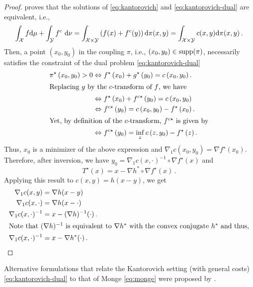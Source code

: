 \begin{proof}
\citet[Theorem 1.39]{santambrogio2015optimal} proves that the solutions of \eqref{eq:kantorovich} and \eqref{eq:kantorovich-dual} are equivalent, i.e.,
\begin{equation*}
	\int_{\mathcal{X}} f \mathrm{d} \mu+\int_{\mathcal{Y}} f^c \mathrm{~d} \nu=\int_{{\mathcal{X}} \times {\mathcal{Y}}}\left(f(x)+f^c(y)\right) \mathrm{d} \pi(x, y)=\int_{{\mathcal{X}} \times {\mathcal{Y}}} c(x, y) \mathrm{d} \pi(x, y)\,.
\end{equation*}
Then, a point $(x_0, y_0)$ in the coupling $\pi$, i.e., $(x_0, y_0) \in \operatorname{supp}(\pi)$, necessarily satisfies the constraint of the dual problem \eqref{eq:kantorovich-dual}
\begin{align*}
\pi^{\star}\left(x_0, y_0\right)>0 & \Leftrightarrow f^{\star}\left(x_0\right)+g^{\star}\left(y_0\right)=c\left(x_0, y_0\right). \\
\intertext{Replacing $g$ by the $c$-transform of $f$, we have}
& \Leftrightarrow f^{\star}\left(x_0\right)+ f^{c\star}\left(y_0\right)=c\left(x_0, y_0\right) \\
& \Leftrightarrow f^{c\star}\left(y_0\right)=c\left(x_0, y_0\right)-f^{\star}\left(x_0\right). \\
\intertext{Yet, by definition of the $c$-transform, $f^{c\star}$ is given by}
& \Leftrightarrow f^{c\star}\left(y_0\right)= \inf_z c\left(z, y_0\right)-f^{\star}\left(z\right).
\end{align*}
Thus, $x_0$ is a minimizer of the above expression and $\nabla_1 c\left(x_0, y_0\right)=\nabla f^{\star}\left(x_0\right)$.  
Therefore, after inversion, we have $y_0=\nabla_1 c(x, \cdot)^{-1} \circ \nabla f^{\star}(x)$ and
\begin{equation*}
		T^{\star}(x)=x-\nabla h^* \circ \nabla f^{\star}(x)\,.
	\end{equation*}
Applying this result to $c(x, y) = h(x-y)$, we get 
\begin{align*}
  \nabla_1 c(x, y) & =\nabla h(x-y) \\
  \nabla_1 c(x, \cdot) & =\nabla h(x-\cdot) \\
  \nabla_1 c(x, \cdot)^{-1} & =x-(\nabla h)^{-1}(\cdot)\,. \\ 
\intertext{Note that $(\nabla h)^{-1}$ is equivalent to $\nabla h^*$ with the convex conjugate $h^*$ and thus,}
  \nabla_1 c(x, \cdot)^{-1} & =x-\nabla h^*(\cdot)\,.	
\end{align*}
\end{proof}
Alternative formulations that relate the Kantorovich setting (with general costs) \eqref{eq:kantorovich-dual} to that of Monge \eqref{eq:monge} were proposed by \citet{ruschendorf1991bounds, ruschendorf1991frechet, caffarelli2017allocation}. \\

